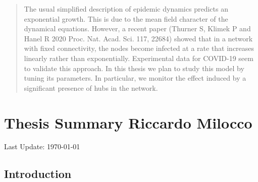\documentclass[a4paper,11pt,twoside]{report} %
\begin{document}

\newcommand{\changefont}{%
    \fontsize{7}{12}\selectfont
}
\fancyhf{}
\fancyhead[LE,RO]{\changefont \slshape \rightmark} %
\fancyhead[RE,LO]{\changefont \slshape \leftmark} %
\fancyfoot[C]{\thepage}
\pagestyle{fancy}



\begin{abstract}
The usual simplified description of epidemic dynamics predicts an exponential growth. This is due to the mean field character of the
dynamical equations. However, a recent paper (Thurner S, Klimek P and Hanel R 2020 Proc. Nat. Acad. Sci. 117, 22684) \cite{Thurner22684} showed
that in a network with fixed connectivity, the nodes become infected at a rate that increases linearly rather than exponentially.
Experimental data for COVID-19 seem to validate this approach. In this thesis we plan to study this model by tuning its parameters.
In particular, we monitor the effect induced by a significant presence of hubs in the network.
\end{abstract}


\chapter[Introduction]{Thesis Summary Riccardo Milocco}
%

Last Update: \today

\section{Introduction}
\end{document}
